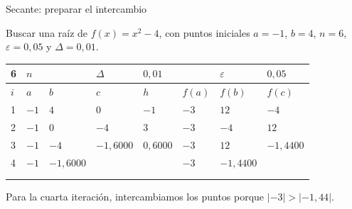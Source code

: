 \documentclass[original_version/main.tex]{subfiles}
\begin{document}
\begin{frame}[t]{Secante: preparar el intercambio}
\begin{minipage}[t][13mm][t]{\textwidth}\small Buscar una raíz de $f(x)=x^2-4$, con puntos iniciales $a=-1$, $b=4$, $n=6$, $\varepsilon=0{,}05$ y $\Delta=0{,}01$.\end{minipage}\par{\scriptsize\setlength{\tabcolsep}{2pt}\renewcommand{\arraystretch}{1}\begin{center}\begin{tabular}{|C{.04\textwidth}|C{.112\textwidth}|C{.112\textwidth}|C{.112\textwidth}|C{.112\textwidth}|C{.112\textwidth}|C{.112\textwidth}|C{.112\textwidth}|}
\hline
\rule{0pt}{4.3mm}6 & $n$ &  &  $\Delta$  & $0{,}01$ &  & $\varepsilon$ & $0{,}05$\\\hline
\rule{0pt}{4.3mm}$i$ & $a$ & $b$ & $c$ & $h$ & $f(a)$ & $f(b)$ & $f(c)$\\\hline
\rule{0pt}{4.3mm}1 & $-1$ & $4$ & $0$ & $-1$ & $-3$ & $12$ & $-4$\\\hline
\rule{0pt}{4.3mm}2 & $-1$ & $0$ & $-4$ & $3$ & $-3$ & $-4$ & $12$\\\hline
\rule{0pt}{4.3mm}3 & $-1$ & $-4$ & $-1{,}6000$ & $0{,}6000$ & $-3$ & $12$ & $-1{,}4400$\\\hline
\rule{0pt}{4.3mm}4 & $-1$ & $-1{,}6000$ &  &  & $-3$ & $-1{,}4400$ & \\\hline
\rule{0pt}{4.3mm} &  &  &  &  &  &  & \\\hline
\rule{0pt}{4.3mm} &  &  &  &  &  &  & \\\hline
\end{tabular}\end{center}}\begin{minipage}[t][10mm][t]{\textwidth}\footnotesize Para la cuarta iteración, intercambiamos los puntos porque $|-3|>|-1{,}44|$.\end{minipage}
\end{frame}
\end{document}
